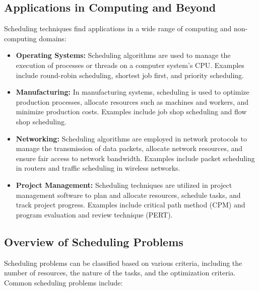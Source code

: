 \documentclass[12pt]{book} %
\begin{document}
\subsection{Applications in Computing and Beyond}

Scheduling techniques find applications in a wide range of computing and non-computing domains:

\begin{itemize}
    \item \textbf{Operating Systems:} Scheduling algorithms are used to manage the execution of processes or threads on a computer system's CPU. Examples include round-robin scheduling, shortest job first, and priority scheduling.
    \item \textbf{Manufacturing:} In manufacturing systems, scheduling is used to optimize production processes, allocate resources such as machines and workers, and minimize production costs. Examples include job shop scheduling and flow shop scheduling.
    \item \textbf{Networking:} Scheduling algorithms are employed in network protocols to manage the transmission of data packets, allocate network resources, and ensure fair access to network bandwidth. Examples include packet scheduling in routers and traffic scheduling in wireless networks.
    \item \textbf{Project Management:} Scheduling techniques are utilized in project management software to plan and allocate resources, schedule tasks, and track project progress. Examples include critical path method (CPM) and program evaluation and review technique (PERT).
\end{itemize}

\subsection{Overview of Scheduling Problems}

Scheduling problems can be classified based on various criteria, including the number of resources, the nature of the tasks, and the optimization criteria. Common scheduling problems include:
\end{document}
